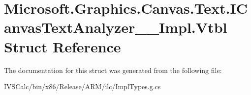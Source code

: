 \hypertarget{struct_microsoft_1_1_graphics_1_1_canvas_1_1_text_1_1_i_canvas_text_analyzer_____impl_1_1_vtbl}{}\section{Microsoft.\+Graphics.\+Canvas.\+Text.\+I\+Canvas\+Text\+Analyzer\+\_\+\+\_\+\+Impl.\+Vtbl Struct Reference}
\label{struct_microsoft_1_1_graphics_1_1_canvas_1_1_text_1_1_i_canvas_text_analyzer_____impl_1_1_vtbl}


The documentation for this struct was generated from the following file\+:\begin{DoxyCompactItemize}
\item 
I\+V\+S\+Calc/bin/x86/\+Release/\+A\+R\+M/ilc/Impl\+Types.\+g.\+cs\end{DoxyCompactItemize}
